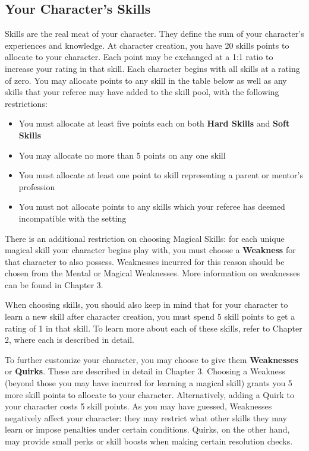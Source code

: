 \documentclass[oneside]{book}
\begin{document}
\begin{multicols}{2}
\section{Your Character's Skills}
Skills are the real meat of your character. They define the sum of your character's experiences and knowledge. At character creation, you have 20 skills points to allocate to your character. Each point may be exchanged at a 1:1 ratio to increase your rating in that skill. Each character begins with all skills at a rating of zero. You may allocate points to any skill in the table below as well as any skills that your referee may have added to the skill pool, with the following restrictions:
	\begin{itemize}
		\item{ \small You must allocate at least five points each on both \textbf{Hard Skills} and \textbf{Soft Skills}}
		\item{ \small You may allocate no more than 5 points on any one skill}
		\item{ \small You must allocate at least one point to skill representing a parent or mentor's profession}
		\item{ \small You must not allocate points to any skills which your referee has deemed incompatible with the setting}
\end{itemize}	

There is an additional restriction on choosing Magical Skills: for each unique magical skill your character begins play with, you must choose a \textbf{Weakness} for that character to also possess. Weaknesses incurred for this reason should be chosen from the Mental or Magical Weaknesses. More information on weaknesses can be found in Chapter 3.

When choosing skills, you should also keep in mind that for your character to learn a new skill after character creation, you must spend 5 skill points to get a rating of 1 in that skill. To learn more about each of these skills, refer to Chapter 2, where each is described in detail.

To further customize your character, you may choose to give them \textbf{Weaknesses} or \textbf{Quirks}. These are described in detail in Chapter 3. Choosing a Weakness (beyond those you may have incurred for learning a magical skill) grants you 5 more skill points to allocate to your character. Alternatively, adding a Quirk to your character costs 5 skill points. As you may have guessed, Weaknesses negatively affect your character: they may restrict what other skills they may learn or impose penalties under certain conditions. Quirks, on the other hand, may provide small perks or skill boosts when making certain resolution checks.
\end{multicols}
\newpage
\end{document}
